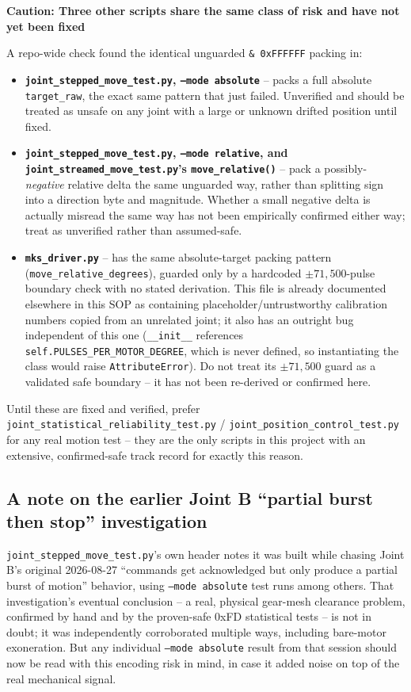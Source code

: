 \documentclass[11pt,letterpaper]{article}
\newenvironment{caution}[1]{%
    \par\addvspace{8pt}%
    \noindent{\color{cautionred}\rule{\linewidth}{0.8pt}}\par\vspace{2pt}
    \noindent\textbf{\color{cautionred}Caution: #1}\par\vspace{2pt}
}{%
    \par\vspace{2pt}\noindent{\color{cautionred}\rule{\linewidth}{0.4pt}}%
    \par\addvspace{8pt}%
}
\begin{document}
\begin{caution}{Three other scripts share the same class of risk and have not yet been fixed}
A repo-wide check found the identical unguarded \texttt{\& 0xFFFFFF} packing in:
\begin{itemize}
    \item \textbf{\texttt{joint\_stepped\_move\_test.py}, \texttt{--mode absolute}} -- packs a full absolute \texttt{target\_raw}, the exact same pattern that just failed. Unverified and should be treated as unsafe on any joint with a large or unknown drifted position until fixed.
    \item \textbf{\texttt{joint\_stepped\_move\_test.py}, \texttt{--mode relative}, and \texttt{joint\_streamed\_move\_test.py}'s \texttt{move\_relative()}} -- pack a possibly-\emph{negative} relative delta the same unguarded way, rather than splitting sign into a direction byte and magnitude. Whether a small negative delta is actually misread the same way has not been empirically confirmed either way; treat as unverified rather than assumed-safe.
    \item \textbf{\texttt{mks\_driver.py}} -- has the same absolute-target packing pattern (\texttt{move\_relative\_degrees}), guarded only by a hardcoded $\pm 71{,}500$-pulse boundary check with no stated derivation. This file is already documented elsewhere in this SOP as containing placeholder/untrustworthy calibration numbers copied from an unrelated joint; it also has an outright bug independent of this one (\texttt{\_\_init\_\_} references \texttt{self.PULSES\_PER\_MOTOR\_DEGREE}, which is never defined, so instantiating the class would raise \texttt{AttributeError}). Do not treat its $\pm 71{,}500$ guard as a validated safe boundary -- it has not been re-derived or confirmed here.
\end{itemize}
Until these are fixed and verified, prefer \texttt{joint\_statistical\_reliability\_test.py} / \texttt{joint\_position\_control\_test.py} for any real motion test -- they are the only scripts in this project with an extensive, confirmed-safe track record for exactly this reason.
\end{caution}

\subsection{A note on the earlier Joint B ``partial burst then stop'' investigation}
\texttt{joint\_stepped\_move\_test.py}'s own header notes it was built while chasing Joint B's original 2026-08-27 ``commands get acknowledged but only produce a partial burst of motion'' behavior, using \texttt{--mode absolute} test runs among others. That investigation's eventual conclusion -- a real, physical gear-mesh clearance problem, confirmed by hand and by the proven-safe 0xFD statistical tests -- is not in doubt; it was independently corroborated multiple ways, including bare-motor exoneration. But any individual \texttt{--mode absolute} result from that session should now be read with this encoding risk in mind, in case it added noise on top of the real mechanical signal.
\end{document}
